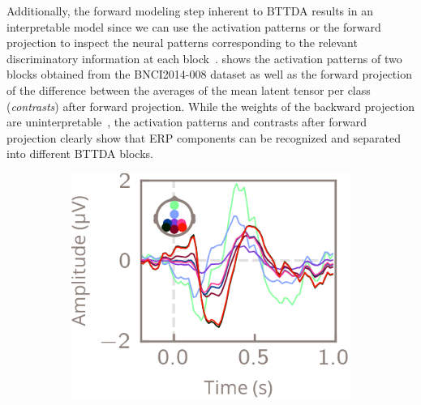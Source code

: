 Additionally, the forward modeling step inherent to BTTDA results
in an interpretable model since we can use the activation patterns or the
forward projection to inspect the neural patterns corresponding to the
relevant discriminatory information at each block~\cite{Haufe2014}.
 shows the activation patterns
of two blocks obtained from the BNCI2014-008 dataset as well as the forward
projection of the difference between the averages of the mean latent tensor per
class (\emph{contrasts}) after forward projection.
While the weights of the backward projection are
uninterpretable~\cite{Haufe2014},
the activation patterns and contrasts after forward projection clearly show
that ERP components can be recognized and separated into different
BTTDA blocks.
\begin{figure}[t]
  \begin{subfigure}[b]{\linewidth}
    \begin{minipage}[b]{.15\linewidth}
      \vspace{3em}
    \end{minipage}\hfill%
    \begin{minipage}[b]{.15\linewidth}
      \vspace{3em}
    \end{minipage}\hfill%
    \begin{minipage}[b]{.25\linewidth}
    \end{minipage}\hfill%
    \begin{minipage}[b]{.3\linewidth}
      \includegraphics[width=\linewidth]{figures/bttda/forward_block-0_contrast.png}
    \end{minipage}
  \end{subfigure}



\end{figure}
